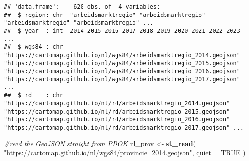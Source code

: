 \documentclass[
]{article}
\newenvironment{Shaded}{\begin{snugshade}}{\end{snugshade}}
\newcommand{\AttributeTok}[1]{\textcolor[rgb]{0.13,0.29,0.53}{#1}}
\newcommand{\CommentTok}[1]{\textcolor[rgb]{0.56,0.35,0.01}{\textit{#1}}}
\newcommand{\ConstantTok}[1]{\textcolor[rgb]{0.56,0.35,0.01}{#1}}
\newcommand{\DecValTok}[1]{\textcolor[rgb]{0.00,0.00,0.81}{#1}}
\newcommand{\FunctionTok}[1]{\textcolor[rgb]{0.13,0.29,0.53}{\textbf{#1}}}
\newcommand{\NormalTok}[1]{#1}
\newcommand{\OtherTok}[1]{\textcolor[rgb]{0.56,0.35,0.01}{#1}}
\newcommand{\SpecialCharTok}[1]{\textcolor[rgb]{0.81,0.36,0.00}{\textbf{#1}}}
\newcommand{\StringTok}[1]{\textcolor[rgb]{0.31,0.60,0.02}{#1}}
\begin{document}
\begin{verbatim}
## 'data.frame':    620 obs. of  4 variables:
##  $ region: chr  "arbeidsmarktregio" "arbeidsmarktregio" "arbeidsmarktregio" "arbeidsmarktregio" ...
##  $ year  : int  2014 2015 2016 2017 2018 2019 2020 2021 2022 2023 ...
##  $ wgs84 : chr  "https://cartomap.github.io/nl/wgs84/arbeidsmarktregio_2014.geojson" "https://cartomap.github.io/nl/wgs84/arbeidsmarktregio_2015.geojson" "https://cartomap.github.io/nl/wgs84/arbeidsmarktregio_2016.geojson" "https://cartomap.github.io/nl/wgs84/arbeidsmarktregio_2017.geojson" ...
##  $ rd    : chr  "https://cartomap.github.io/nl/rd/arbeidsmarktregio_2014.geojson" "https://cartomap.github.io/nl/rd/arbeidsmarktregio_2015.geojson" "https://cartomap.github.io/nl/rd/arbeidsmarktregio_2016.geojson" "https://cartomap.github.io/nl/rd/arbeidsmarktregio_2017.geojson" ...
\end{verbatim}

\begin{Shaded}
\begin{Highlighting}[]
\CommentTok{\#read the GeoJSON straight from PDOK }
\NormalTok{nl\_prov }\OtherTok{\textless{}{-}} \FunctionTok{st\_read}\NormalTok{(}
  \StringTok{"https://cartomap.github.io/nl/wgs84/provincie\_2014.geojson"}\NormalTok{,}
  \AttributeTok{quiet =} \ConstantTok{TRUE}
\NormalTok{)}
\end{Highlighting}
\end{Shaded}

\begin{Shaded}
\end{Shaded}
\end{document}
